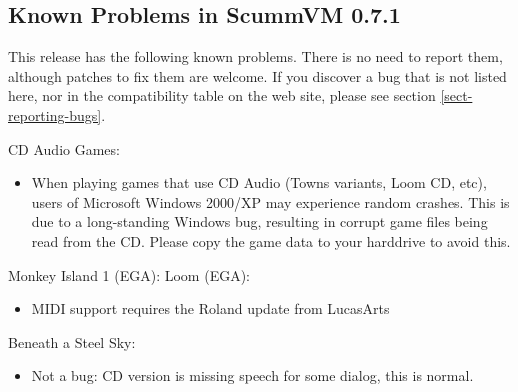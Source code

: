 

\subsection{Known Problems in ScummVM 0.7.1}

This release has the following known problems. There is no need to report them,
although patches to fix them are welcome. If you discover a bug that is not
listed here, nor in the compatibility table on the web site, please see
section \ref{sect-reporting-bugs}.

CD Audio Games:
  \begin{itemize}
  \item When playing games that use CD Audio (Towns variants, Loom CD, etc),
            users of Microsoft Windows 2000/XP may experience random crashes.
            This is due to a long-standing Windows bug, resulting in corrupt
            game files being read from the CD. Please copy the game data to
            your harddrive to avoid this.
  \end{itemize}

Monkey Island 1 (EGA):
Loom (EGA):
  \begin{itemize}
  \item MIDI support requires the Roland update from LucasArts
  \end{itemize}

Beneath a Steel Sky:
  \begin{itemize}
  \item Not a bug: CD version is missing speech for some dialog, this is
            normal.
  \end{itemize}
